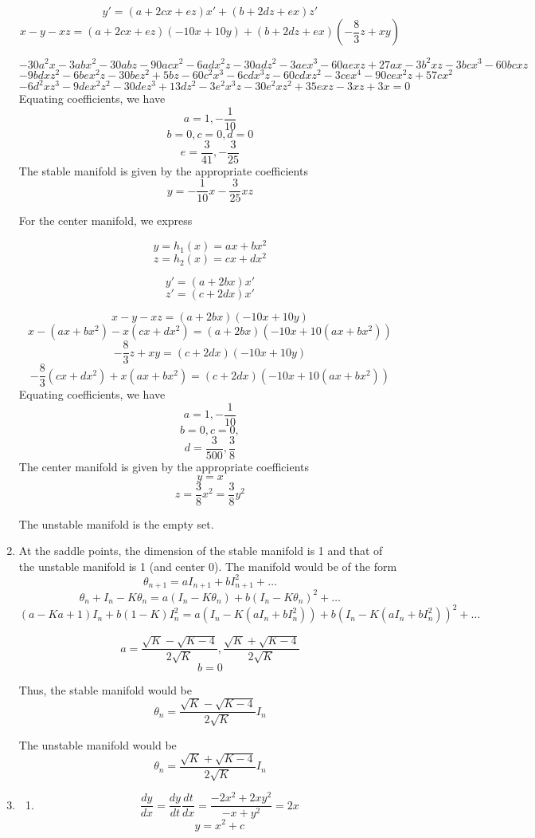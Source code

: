 \documentclass[a4paper]{article}
\begin{document}
\begin{enumerate}
\[y'= (a+2cx+ez)x'  + (b+2dz+ex)z' \]
\[x-y-xz= (a+2cx+ez)(-10x+10y)  + (b+2dz+ex)(-\frac{8}{3}z+xy) \]

\[-30 a^2 x - 3 a b x^2 - 30 a b z - 90 a c x^2 - 6 a d x^2 z - 30 a d z^2 - 3 a e x^3 - 60 a e x z + 27 a x - 3 b^2 x z - 3 b c x^3 - 60 b c x z \]
\[ - 9 b d x z^2 - 6 b e x^2 z - 30 b e z^2 + 5 b z - 60 c^2 x^3 - 6 c d x^3 z - 60 c d x z^2 - 3 c e x^4 - 90 c e x^2 z + 57 c x^2\]\[ - 6 d^2 x z^3 - 9 d e x^2 z^2 - 30 d e z^3 + 13 d z^2 - 3 e^2 x^3 z - 30 e^2 x z^2 + 35 e x z - 3 x z + 3 x=0\]
Equating coefficients, we have
\[a= 1,-\frac{1}{10} \]
\[b=0, c =0, d=0 \]
\[e = \frac{3}{41}, -\frac{3}{25}\]
The stable manifold is given by the appropriate coefficients
\[ y = -\frac{1}{10}x -\frac{3}{25} xz \]

For the center manifold, we express

\[y = h_1(x) = a x + b x^2\]
\[z = h_2(x) = cx +dx^2 \]

\[y' = (a+2bx)x'\]
\[z' = (c+2dx)x'\]

\[x-y-xz = (a+2bx)(-10x+10y) \]
\[x-(a x + b x^2)-x( cx +dx^2) = (a+2bx)(-10x+10(a x + b x^2)) \]
\[-\frac{8}{3}z+xy = (c+2dx)(-10x+10y)\]
\[-\frac{8}{3}(cx +dx^2)+x(a x + b x^2) = (c+2dx)(-10x+10(a x + b x^2))\]
Equating coefficients, we have
\[a= 1,-\frac{1}{10} \]
\[b=0, c =0,  \]
\[d = \frac{3}{500}, \frac{3}{8}\]
The center manifold is given by the appropriate coefficients
\[ y = x \]
\[ z = \frac{3}{8} x^2 =\frac{3}{8} y^2  \]

The unstable manifold is the empty set.
\item 
At the saddle points, the dimension of the stable manifold is 1 and that of the unstable manifold is 1 (and center 0).
The manifold would be of the form 
\[\theta_{n+1} = aI_{n+1} + bI^2_{n+1} + \ldots \]
\[\theta_{n}+I_n - K\theta_n = a(I_n - K\theta_n) + b(I_n - K\theta_n)^2 + \ldots \]
\[(a-Ka+1)I_{n} + b(1-K)I^2_{n}  = a(I_n - K(aI_{n} + bI^2_{n})) + b(I_n - K(aI_{n} + bI^2_{n}))^2 + \ldots \]

\[a= \frac{\sqrt{K} - \sqrt{K - 4}}{2 \sqrt{K}}, \frac{\sqrt{K} + \sqrt{K - 4}}{2 \sqrt{K}}\]
\[b=0\]

Thus, the stable manifold would be
\[\theta_{n} = \frac{\sqrt{K} - \sqrt{K - 4}}{2 \sqrt{K}}I_{n}\]

The unstable manifold would be
\[\theta_{n} = \frac{\sqrt{K} + \sqrt{K - 4}}{2 \sqrt{K}}I_{n}\]

\item 

\begin{enumerate}
	\item
	\[\frac{dy}{dx} =\frac{dy}{dt}\frac{dt}{dx} = \frac{-2x^2+2xy^2}{-x+y^2}  = 2x\]
	\[y = x^2 +c \]


\end{enumerate}
\end{enumerate}
\end{document}
